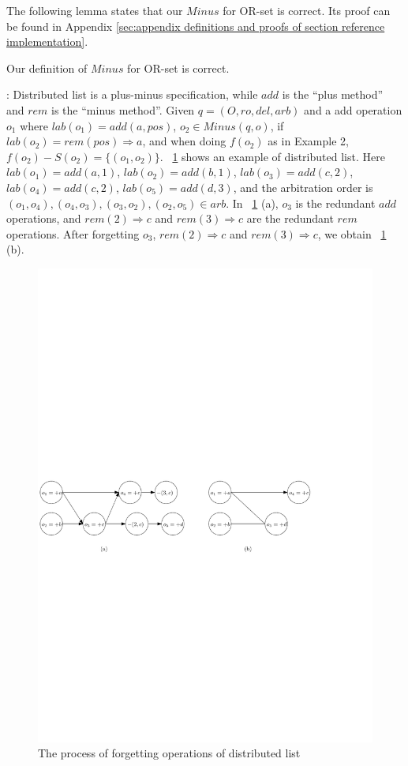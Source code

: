 The following lemma states that our $Minus$ for OR-set is correct. Its proof can be found in Appendix \ref{sec:appendix definitions and proofs of section reference implementation}.

\begin{lemma}
\label{lemma:Minus for OR-set is correct}
Our definition of $Minus$ for OR-set is correct.
\end{lemma}

: Distributed list is a plus-minus specification, while $add$ is the ``plus method'' and $rem$ is the ``minus method''. Given $q=(O,\mathit{ro},\mathit{del},\mathit{arb})$ and a add operation $o_1$ where $lab(o_1)=add(a,pos)$, $o_2 \in Minus(q,o)$, if $lab(o_2)=rem(pos) \Rightarrow a$, and when doing $f(o_2)$ as in Example 2, $f(o_2) - S(o_2) = \{ (o_1,o_2) \}$. \figurename~\ref{fig:the process of penetrate operations in distributed list} shows an example of distributed list. Here $lab(o_1) = add(a,1)$, $lab(o_2) = add(b,1)$, $lab(o_3) = add(c,2)$, $lab(o_4) = add(c,2)$, $lab(o_5) = add(d,3)$, and the arbitration order is $(o_1,o_4),(o_4,o_3),(o_3,o_2),(o_2,o_5) \in \mathit{arb}$. In \figurename~\ref{fig:the process of penetrate operations in distributed list} (a), $o_3$ is the redundant $add$ operations, and $rem(2) \Rightarrow c$ and $rem(3) \Rightarrow c$ are the redundant $rem$ operations. After forgetting $o_3$, $rem(2) \Rightarrow c$ and $rem(3) \Rightarrow c$, we obtain \figurename~\ref{fig:the process of penetrate operations in distributed list} (b).

\begin{figure}[t]
  \centering
  \includegraphics[width=0.7 \textwidth]{figures/PIC-Example-CompactProcess-list}
  \caption{The process of forgetting operations of distributed list}
  \label{fig:the process of penetrate operations in distributed list}
\end{figure}


